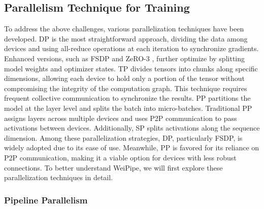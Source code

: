 \documentclass[sigplan,review]{acmart}
\begin{document}
\subsection{Parallelism Technique for Training}
To address the above challenges, various parallelization techniques have been developed. DP is the most straightforward approach, dividing the data among devices and using all-reduce operations at each iteration to synchronize gradients. Enhanced versions, such as FSDP \cite{zhao2023pytorchfsdpexperiencesscaling} and ZeRO-3 \cite{rajbhandari2020zeromemoryoptimizationstraining}, further optimize by splitting model weights and optimizer states. TP \cite{shoeybi2019megatron, xu2021efficient, wang2022tesseract, li2023automatedtensormodelparallelism, cheng2023atpadaptivetensorparallelism} divides tensors into chunks along specific dimensions, allowing each device to hold only a portion of the tensor without compromising the integrity of the computation graph. This technique requires frequent collective communication to synchronize the results. PP \cite{gems, gpipe, dapple, li2021chimera, hanayo, qi2023zerobubblepipelineparallelism} partitions the model at the layer level and splits the batch into micro-batches. Traditional PP assigns layers across multiple devices and uses P2P communication to pass activations between devices. Additionally, SP \cite{jacobs2023Ulysses, liu2023ring, gu2024loongtrainefficienttraininglongsequence, li2022sequence, liu2024wallfacerguidingtransformermodel} splits activations along the sequence dimension. Among these parallelization strategies, DP, particularly FSDP, is widely adopted due to its ease of use. Meanwhile, PP is favored for its reliance on P2P communication, making it a viable option for devices with less robust connections. To better understand WeiPipe, we will first explore these parallelization techniques in detail.

\subsubsection{Pipeline Parallelism}
\end{document}
